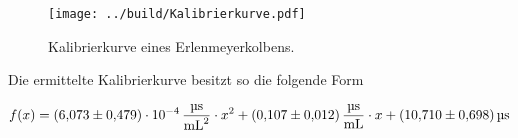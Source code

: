 \begin{figure}[H]
    \centering
    \texttt{[image: ../build/Kalibrierkurve.pdf]}
    \caption{Kalibrierkurve eines Erlenmeyerkolbens.}
    \label{fig:Kalibrierkurve}
\end{figure}

\noindent Die ermittelte Kalibrierkurve besitzt so die folgende Form

\begin{equation*}
    f(x)= \qty{6.073\pm0.479e-4}{\micro \second \per \milli \liter \squared } \cdot x^2   +  
          \qty{0.107\pm0.012}{\micro \second \per \milli \liter}              \cdot x     +
          \qty{10.71\pm0.698}{\micro \second }
\end{equation*}



